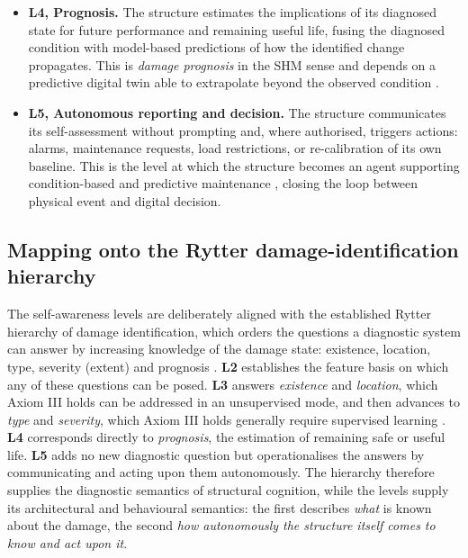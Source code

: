 \begin{itemize}
\item \textbf{L4, Prognosis.} The structure estimates the implications of its diagnosed state for future performance and remaining useful life, fusing the diagnosed condition with model-based predictions of how the identified change propagates. This is \textit{damage prognosis} in the SHM sense \citep{farrar2013shm} and depends on a predictive digital twin able to extrapolate beyond the observed condition \citep{zou2026deep}.
\item \textbf{L5, Autonomous reporting and decision.} The structure communicates its self-assessment without prompting and, where authorised, triggers actions: alarms, maintenance requests, load restrictions, or re-calibration of its own baseline. This is the level at which the structure becomes an agent supporting condition-based and predictive maintenance \citep{farrar2013shm,naser2023ml}, closing the loop between physical event and digital decision.
\end{itemize}

\subsection{Mapping onto the Rytter damage-identification hierarchy}\label{subsec:rytter}

The self-awareness levels are deliberately aligned with the established Rytter hierarchy of damage identification, which orders the questions a diagnostic system can answer by increasing knowledge of the damage state: existence, location, type, severity (extent) and prognosis \citep{farrar2013shm}. \textbf{L2} establishes the feature basis on which any of these questions can be posed. \textbf{L3} answers \textit{existence} and \textit{location}, which Axiom III holds can be addressed in an unsupervised mode, and then advances to \textit{type} and \textit{severity}, which Axiom III holds generally require supervised learning \citep{farrar2013shm,wangcha2022unsupervised}. \textbf{L4} corresponds directly to \textit{prognosis}, the estimation of remaining safe or useful life. \textbf{L5} adds no new diagnostic question but operationalises the answers by communicating and acting upon them autonomously. The hierarchy therefore supplies the diagnostic semantics of structural cognition, while the levels supply its architectural and behavioural semantics: the first describes \textit{what} is known about the damage, the second \textit{how autonomously the structure itself comes to know and act upon it}.

